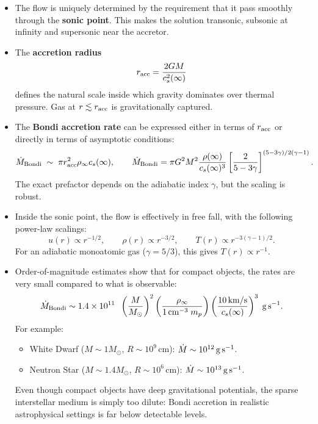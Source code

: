 \begin{itemize}
    \item The flow is uniquely determined by the requirement that it pass smoothly through the \textbf{sonic point}. This makes the solution transonic, subsonic at infinity and supersonic near the accretor. 
    \item The \textbf{accretion radius} 
    \[
    r_{\rm acc} = \frac{2GM}{c_s^2(\infty)}
    \]
    defines the natural scale inside which gravity dominates over thermal pressure. Gas at $r \lesssim r_{\rm acc}$ is gravitationally captured.
    \item The \textbf{Bondi accretion rate} can be expressed either in terms of $r_{\rm acc}$ or directly in terms of asymptotic conditions:
    \[
    \dot{M}_{\rm Bondi} \;\sim\; \pi r_{\rm acc}^2 \rho_\infty c_s(\infty),
    \qquad
    \dot{M}_{\rm Bondi} = \pi G^2 M^2 \frac{\rho(\infty)}{c_s(\infty)^3}\left[\frac{2}{5-3\gamma}\right]^{(5-3\gamma)/2(\gamma-1)}.
    \]
    The exact prefactor depends on the adiabatic index $\gamma$, but the scaling is robust.
    \item Inside the sonic point, the flow is effectively in free fall, with the following power-law scalings:
    \[
    u(r) \propto r^{-1/2}, \qquad \rho(r) \propto r^{-3/2}, \qquad T(r) \propto r^{-3(\gamma-1)/2}.
    \]
    For an adiabatic monoatomic gas ($\gamma=5/3$), this gives $T(r) \propto r^{-1}$.
    \item Order-of-magnitude estimates show that for compact objects, the rates are very small compared to what is observable:
    \[
    \dot{M}_{\rm Bondi} \sim 1.4 \times 10^{11}\;\; \left(\frac{M}{M_\odot}\right)^2 \left(\frac{\rho_\infty}{1\,{\rm cm}^{-3}\;m_p}\right)\left(\frac{10\,{\rm km/s}}{c_s(\infty)}\right)^3 \;{\rm g\,s^{-1}}.
    \]
    For example:
    \begin{itemize}
        \item White Dwarf ($M \sim 1M_\odot$, $R \sim 10^9\,$cm): $\dot{M} \sim 10^{12}\,{\rm g\,s^{-1}}$.
        \item Neutron Star ($M \sim 1.4M_\odot$, $R \sim 10^6\,$cm): $\dot{M} \sim 10^{13}\,{\rm g\,s^{-1}}$.
    \end{itemize}
    
Even though compact objects have deep gravitational potentials, the sparse interstellar medium is simply too dilute: Bondi accretion in realistic astrophysical settings is far below detectable levels.
\end{itemize}
\vspace{0.5cm}

